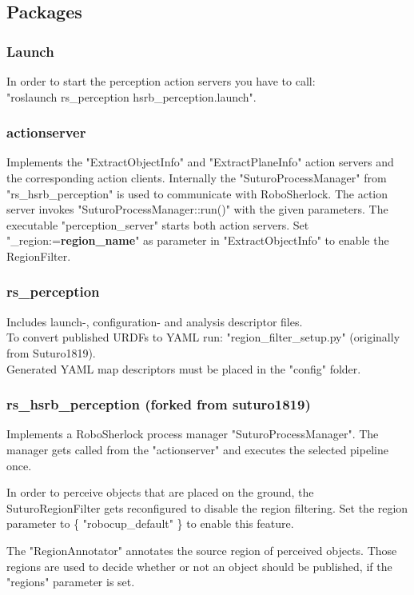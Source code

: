 \documentclass[main.tex]{subfiles}
\begin{document}
			\subsection{Packages}
			\subsubsection{Launch}
			In order to start the perception action servers you have to call:\\
			"roslaunch rs\_perception hsrb\_perception.launch".

			\subsubsection{actionserver}
			Implements the "ExtractObjectInfo" and "ExtractPlaneInfo" action servers and the corresponding action clients.
			Internally the "SuturoProcessManager" from "rs\_hsrb\_perception" is used to communicate with RoboSherlock.
			The action server invokes "SuturoProcessManager::run()" with the given parameters.
			The executable "perception\_server" starts both action servers.
			Set "\_region:=\textbf{region\_name}" as parameter in "ExtractObjectInfo" to enable the RegionFilter.

			\subsubsection{rs\_perception}
			Includes launch-, configuration- and analysis descriptor files.\\
			To convert published URDFs to YAML run: "region\_filter\_setup.py" (originally from Suturo1819).\\
			Generated YAML map descriptors must be placed in the "config" folder.

			\subsubsection{rs\_hsrb\_perception (forked from suturo1819)}
			Implements a RoboSherlock process manager "SuturoProcessManager".
			The manager gets called from the "actionserver" and executes the selected pipeline once.

			In order to perceive objects that are placed on the ground, the SuturoRegionFilter gets reconfigured
			to disable the region filtering. Set the region parameter to \{ "robocup\_default" \} to enable this feature.

			The "RegionAnnotator" annotates the source region of perceived objects. Those regions are used
			to decide whether or not an object should be published, if the "regions" parameter is set.
\end{document}
